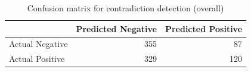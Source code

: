 \begin{table}
\caption{Confusion matrix for contradiction detection (overall)}
\label{tab:confusion_matrix}
\begin{tabular}{lrr}
\toprule
 & Predicted Negative & Predicted Positive \\
\midrule
Actual Negative & 355 & 87 \\
Actual Positive & 329 & 120 \\
\bottomrule
\end{tabular}
\end{table}
